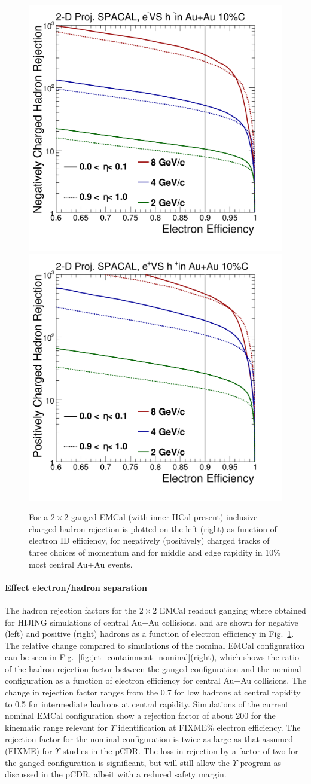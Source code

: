 \begin{figure}[hbt]
  \centering
  \includegraphics[width=0.4\linewidth]{figs/DrawEcal_Likelihood_Sum_RejectionCurve_AuAuSummary}
  \hspace{0.1\linewidth}
  \includegraphics[width=0.4\linewidth]{figs/DrawEcal_Likelihood_Sum_RejectionCurve_AuAuSummaryPos}
  \caption{For a $2\times2$ ganged EMCal (with inner HCal present)
    inclusive charged hadron rejection is plotted on the left (right)
    as function of electron ID efficiency, for negatively (positively)
    charged tracks of three choices of momentum and for middle and
    edge rapidity in 10\% most central Au+Au events.}
  \label{fig:eid_auau}
\end{figure}

\paragraph{Effect electron/hadron separation}

The hadron rejection factors  for the $2\times 2$ EMCal readout ganging where obtained for HIJING simulations of central Au+Au collisions, and are
shown for negative (left) and positive (right) hadrons as a function of electron efficiency in Fig.~\ref{fig:eid_auau}. 
The relative change compared to simulations of the nominal EMCal configuration can be seen in Fig.~\ref{fig:jet_containment_nominal}(right), which shows
the ratio of the hadron rejection factor between the ganged configuration and the nominal configuration as a function
of electron efficiency for central Au+Au collisions. The change in rejection factor ranges from the 0.7 for low \pt hadrons
at central rapidity to 0.5 for intermediate \pt hadrons at central rapidity. Simulations of the current nominal EMCal 
configuration show a rejection factor of about 200 for the kinematic range relevant for $\Upsilon$ identification at FIXME\%
electron efficiency. The rejection factor for the nominal configuration is twice as large as that assumed (FIXME) 
for $\Upsilon$ studies in the pCDR. The loss in rejection by a factor of two for the ganged configuration is significant, but
will still allow the $\Upsilon$ program as discussed in the pCDR, albeit with a reduced safety margin.

